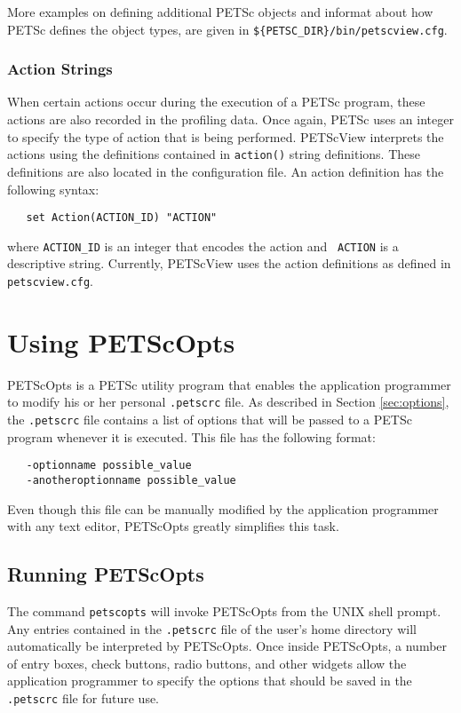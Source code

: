 More examples on defining additional PETSc objects and informat
about how PETSc defines the object types, are given in 
{\tt \$\{PETSC\_DIR\}/bin/petscview.cfg}.

\subsubsection{Action Strings}

When certain actions occur during the execution of a PETSc program,
these actions are also recorded in the profiling data.  Once again,
PETSc uses an integer to specify the type of action that is being
performed.  PETScView interprets the actions using the
definitions contained in {\tt action()} string definitions.  These
definitions are also located in the configuration file.  An action
definition has the following syntax:
\begin{verbatim}
   set Action(ACTION_ID) "ACTION"
\end{verbatim}
where {\tt ACTION\_ID} is an integer that encodes the action and {\tt
ACTION} is a descriptive string.  Currently, PETScView uses the action
definitions as defined in {\tt petscview.cfg}.

\section{Using PETScOpts}
\label{sec:petscopts}

PETScOpts is a PETSc utility program that enables the application
programmer to modify his or her personal {\tt .petscrc} file.  As
described in Section \ref{sec:options}, the {\tt .petscrc} file
contains a list of options that will be passed to a PETSc program
whenever it is executed.  This file has the following format:
\begin{verbatim}
   -optionname possible_value
   -anotheroptionname possible_value
\end{verbatim}
Even though this file can be manually modified by the application
programmer with any text editor, PETScOpts greatly simplifies this
task.

\subsection{Running PETScOpts}

The command {\tt petscopts} will invoke PETScOpts from the UNIX
shell prompt.  Any entries contained in the {\tt .petscrc} file of the
user's home directory will automatically be interpreted by PETScOpts.
Once inside PETScOpts, a number of entry boxes, check
buttons, radio buttons, and other widgets allow the application
programmer to specify the options that should be saved in the {\tt
.petscrc} file for future use.

